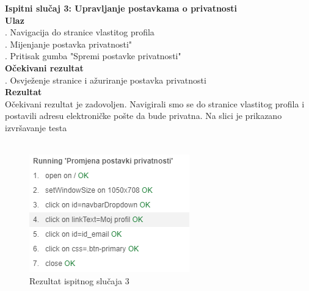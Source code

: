 {			 \noindent \textbf{Ispitni slučaj 3: Upravljanje postavkama o privatnosti}
			 \\
			 \textbf{Ulaz}
			 \\
			 . Navigacija do stranice vlastitog profila \\
			 . Mijenjanje postavka privatnosti" \\
			 . Pritisak gumba "Spremi postavke privatnosti" \\
			 \textbf{Očekivani rezultat}
			 \\
			 . Osvježenje stranice i ažuriranje postavka privatnosti\\
			 \textbf{Rezultat}
			 \\
			 \indent Očekivani rezultat je zadovoljen. Navigirali smo se do stranice vlastitog profila i postavili adresu elektroničke pošte da bude privatna. Na slici je prikazano izvršavanje testa
			 \\ \\
			 \begin{figure}[H]
			 	\centering
			 	\includegraphics[scale=0.7]{"slike/test9"}
			 	\caption{Rezultat ispitnog slučaja 3}
			 	\label{fig:rezultat-ispitnog-slucaja-9}
			 \end{figure}
			 
}
